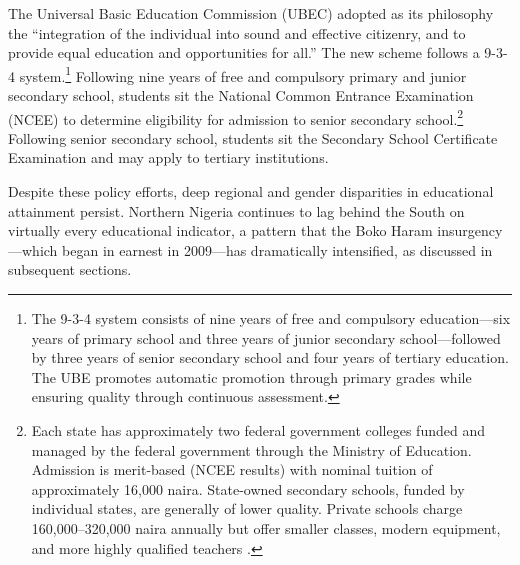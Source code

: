 The Universal Basic Education Commission (UBEC) adopted as its philosophy
the ``integration of the individual into sound and effective citizenry,
and to provide equal education and opportunities for all.'' The new
scheme follows a 9-3-4 system.\footnote{The 9-3-4 system consists of nine
years of free and compulsory education---six years of primary school and
three years of junior secondary school---followed by three years of senior
secondary school and four years of tertiary education. The UBE promotes
automatic promotion through primary grades while ensuring quality through
continuous assessment.} Following nine years of free and compulsory
primary and junior secondary school, students sit the National Common
Entrance Examination (NCEE) to determine eligibility for admission to
senior secondary school.\footnote{Each state has approximately two federal
government colleges funded and managed by the federal government through
the Ministry of Education. Admission is merit-based (NCEE results) with
nominal tuition of approximately 16,000 naira. State-owned secondary
schools, funded by individual states, are generally of lower quality.
Private schools charge 160,000--320,000 naira annually but offer smaller
classes, modern equipment, and more highly qualified teachers
\citep{nigeria_education_profile}.} Following senior secondary school,
students sit the Secondary School Certificate Examination and may apply
to tertiary institutions.

\bigskip
\noindent Despite these policy efforts, deep regional and gender disparities in
educational attainment persist. Northern Nigeria continues to lag behind
the South on virtually every educational indicator, a pattern that the
Boko Haram insurgency---which began in earnest in 2009---has dramatically
intensified, as discussed in subsequent sections.
